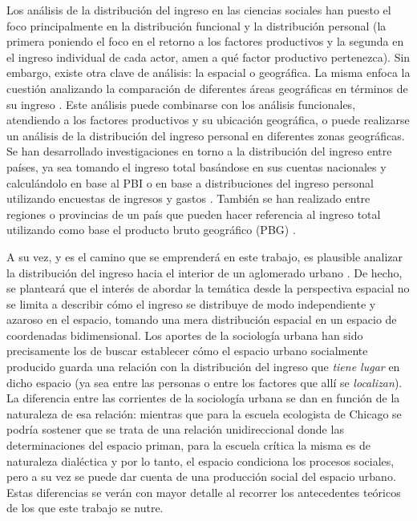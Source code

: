 Los análisis de la distribución del ingreso en las ciencias sociales han puesto el foco principalmente en la distribución funcional y la distribución personal (la primera poniendo el foco en el retorno a los factores productivos y la segunda en el ingreso individual de cada actor, amen a qué factor productivo pertenezca). Sin embargo, existe otra clave de análisis: la espacial o geográfica. La misma enfoca la cuestión analizando la comparación de diferentes áreas geográficas en términos de su ingreso \cite{gasparini2001}. Este análisis puede combinarse con los análisis funcionales, atendiendo a los factores productivos y su ubicación geográfica, o puede realizarse un análisis de la distribución del ingreso personal en diferentes zonas geográficas. Se han desarrollado investigaciones en torno a la distribución del ingreso entre países, ya sea tomando el ingreso total basándose en sus cuentas nacionales y calculándolo en base al PBI \cite{theil} o en base a distribuciones del ingreso personal utilizando encuestas de ingresos y gastos \cite{milanovic2002,milanovic2005,davies}. También se han realizado entre regiones o provincias de un país \cite{artana} que pueden hacer referencia al ingreso total utilizando como base el producto bruto geográfico (PBG) \cite{altimir1975}.

A su vez, y es el camino que se emprenderá en este trabajo, es plausible analizar la distribución del ingreso hacia el interior de un aglomerado urbano \cite{gasparini2000,giayetto}. De hecho, se planteará que el interés de abordar la temática desde la perspectiva espacial no se limita a describir cómo el ingreso se distribuye de modo independiente y azaroso en el espacio, tomando una mera distribución espacial en un espacio de coordenadas bidimensional. Los aportes de la sociología urbana han sido precisamente los de buscar establecer cómo el espacio urbano socialmente producido guarda una relación con la distribución del ingreso que \textit{tiene lugar} en dicho espacio (ya sea entre las personas o entre los factores que allí se \textit{localizan}). La diferencia entre las corrientes de la sociología urbana se dan en función de la naturaleza de esa relación: mientras que para la escuela ecologista de Chicago \cite{park,burgess1928,mckenzie,wirth} se podría sostener que se trata de una relación unidireccional donde las determinaciones del espacio priman, para la escuela crítica \cite{lefebvre,castells,harvey} la misma es de naturaleza dialéctica y por lo tanto, el espacio condiciona los procesos sociales, pero a su vez se puede dar cuenta de una producción social del espacio urbano. Estas diferencias se verán con mayor detalle al recorrer los antecedentes teóricos de los que este trabajo se nutre.


